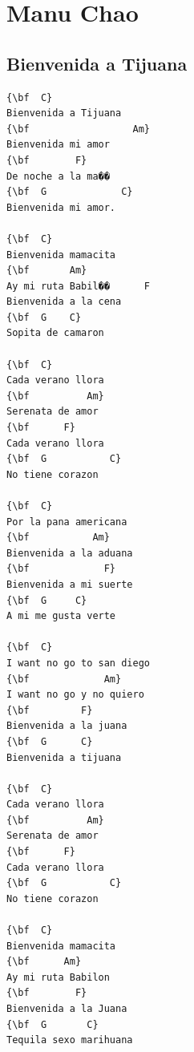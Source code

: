 \documentclass[a4paper]{article}
\begin{document}
\section{Manu Chao}
\subsection{Bienvenida a Tijuana}
\begin{multicols}{2}\begin{Verbatim}[commandchars=\\\{\}]
{\bf  C}
Bienvenida a Tijuana
{\bf                  Am}
Bienvenida mi amor
{\bf        F}
De noche a la ma��
{\bf  G             C}
Bienvenida mi amor. 

{\bf  C}
Bienvenida mamacita
{\bf       Am}
Ay mi ruta Babil��      F
Bienvenida a la cena 
{\bf  G    C}
Sopita de camaron

{\bf  C}
Cada verano llora
{\bf          Am}
Serenata de amor
{\bf      F}
Cada verano llora
{\bf  G           C}
No tiene corazon

{\bf  C}
Por la pana americana
{\bf           Am}
Bienvenida a la aduana
{\bf             F}
Bienvenida a mi suerte 
{\bf  G     C}
A mi me gusta verte

{\bf  C}
I want no go to san diego
{\bf             Am}
I want no go y no quiero
{\bf         F}
Bienvenida a la juana 
{\bf  G      C}
Bienvenida a tijuana

{\bf  C}
Cada verano llora
{\bf          Am}
Serenata de amor
{\bf      F}
Cada verano llora
{\bf  G           C}
No tiene corazon

{\bf  C}
Bienvenida mamacita
{\bf      Am}
Ay mi ruta Babilon
{\bf        F}
Bienvenida a la Juana 
{\bf  G       C}
Tequila sexo marihuana

\end{Verbatim}
\end{multicols}\newpage
\end{document}
